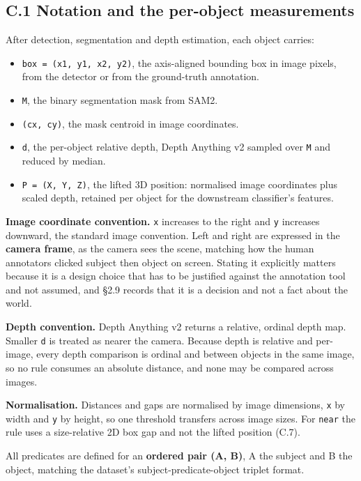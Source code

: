\subsection{C.1 Notation and the per-object measurements}

After detection, segmentation and depth estimation, each object carries:

\begin{itemize}
\item \texttt{box = (x1, y1, x2, y2)}, the axis-aligned bounding box in image pixels, from the detector or from the ground-truth annotation.
\item \texttt{M}, the binary segmentation mask from SAM2.
\item \texttt{(cx, cy)}, the mask centroid in image coordinates.
\item \texttt{d}, the per-object relative depth, Depth Anything v2 sampled over \texttt{M} and reduced by median.
\item \texttt{P = (X, Y, Z)}, the lifted 3D position: normalised image coordinates plus scaled depth, retained per object for the downstream classifier's features.
\end{itemize}

\textbf{Image coordinate convention.} \texttt{x} increases to the right and \texttt{y} increases downward, the standard image convention. Left and right are expressed in the \textbf{camera frame}, as the camera sees the scene, matching how the human annotators clicked subject then object on screen. Stating it explicitly matters because it is a design choice that has to be justified against the annotation tool and not assumed, and \S{}2.9 records that it is a decision and not a fact about the world.

\textbf{Depth convention.} Depth Anything v2 returns a relative, ordinal depth map. Smaller \texttt{d} is treated as nearer the camera. Because depth is relative and per-image, every depth comparison is ordinal and between objects in the same image, so no rule consumes an absolute distance, and none may be compared across images.

\textbf{Normalisation.} Distances and gaps are normalised by image dimensions, \texttt{x} by width and \texttt{y} by height, so one threshold transfers across image sizes. For \texttt{near} the rule uses a size-relative 2D box gap and not the lifted position (C.7).

All predicates are defined for an \textbf{ordered pair (A, B)}, A the subject and B the object, matching the dataset's subject-predicate-object triplet format.

